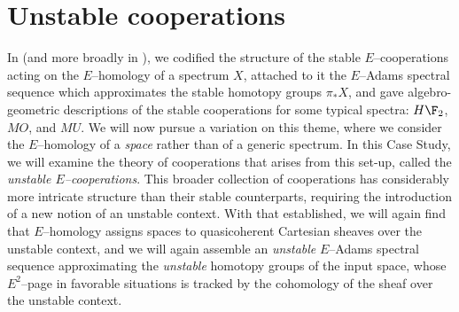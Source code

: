 
\chapter{Unstable cooperations}\label{UnstableCooperationsChapter}


In  (and more broadly in ), we codified the structure of the stable $E$--cooperations acting on the $E$--homology of a spectrum $X$, attached to it the $E$--Adams spectral sequence which approximates the stable homotopy groups $\pi_* X$, and gave algebro-geometric descriptions of the stable cooperations for some typical spectra: $H\F_2$, $MO$, and $MU$.  We will now pursue a variation on this theme, where we consider the $E$--homology of a \emph{space} rather than of a generic spectrum.  In this Case Study, we will examine the theory of cooperations that arises from this set-up, called the \textit{unstable $E$--cooperations}.  This broader collection of cooperations has considerably more intricate structure than their stable counterparts, requiring the introduction of a new notion of an unstable context.  With that established, we will again find that $E$--homology assigns spaces to quasicoherent Cartesian sheaves over the unstable context, and we will again assemble an \emph{unstable} $E$--Adams spectral sequence approximating the \emph{unstable} homotopy groups of the input space, whose $E^2$--page in favorable situations is tracked by the cohomology of the sheaf over the unstable context.

